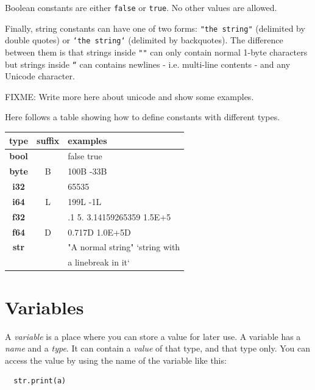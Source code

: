 \documentclass[11pt,fleqn,openany]{book} %
\begin{document}
Boolean constants are either \texttt{false} or \texttt{true}. No other values are allowed.

 Finally, string constants can have one of two forms: \texttt{"the string"} (delimited by double quotes) or \texttt{`the string`} (delimited by backquotes). The difference between them is that strings inside \texttt{""} can only contain normal 1-byte characters but strings inside \texttt{``} can contains newlines - i.e. multi-line contents - and any Unicode character.

FIXME: Write more here about unicode and show some examples.

Here follows a table showing how to define constants with different types.

\begin{center}
    \begin{tabular}{|c|c|l|}
        \hline
        \textbf{type} & \textbf{suffix} & \textbf{examples} \\
        \hline
        \textbf{bool} &   & false true  \\
        \hline
        \textbf{byte} & B & 100B -33B \\
        \hline
        \textbf{i32}  &   & 65535 \\
        \hline
        \textbf{i64}  & L & 199L -1L \\
        \hline
        \textbf{f32}  &   & .1 5. 3.14159265359 1.5E+5\\
        \hline
        \textbf{f64}  & D & 0.717D 1.0E+5D \\
        \hline
        \textbf{str}  &   & "A normal string" `string with \\
                      &   & a linebreak in it` \\
        \hline 
    \end{tabular}
\end{center}

\section{Variables}

A \emph{variable} is a place where you can store a value for later use. A variable has a \emph{name} and a \emph{type}. It can contain a \emph{value} of that type, and that type only. You can access the value by using the name of the variable like this:

\begin{lstlisting}
  str.print(a)
\end{lstlisting}
\end{document}
